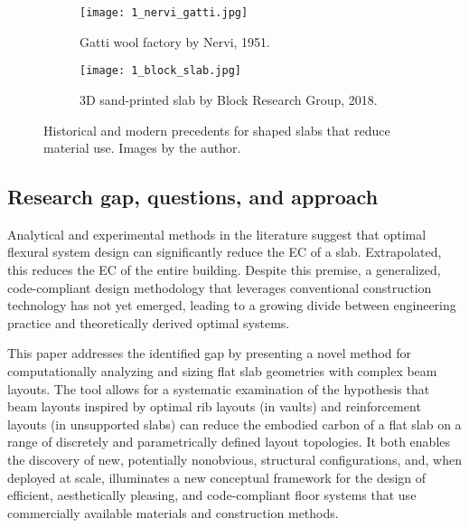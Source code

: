 \documentclass[10pt, letterpaper]{article} %
\begin{document}
    \begin{figure}[ht]
        \centering
        \begin{subfigure}[c]{0.4\textwidth}
            \centering
            \texttt{[image: 1\_nervi\_gatti.jpg]} 
            \caption{Gatti wool factory by Nervi, 1951. \cite{nerviAestheticsTechnologyBuilding1965}}
            \label{fig:subfigure1}
        \end{subfigure}
        \hfill
        \begin{subfigure}[c]{0.53\textwidth}
            \centering
            \texttt{[image: 1\_block\_slab.jpg]} 
            \caption{3D sand-printed slab by Block Research Group, 2018. \cite{rippmannDesignFabricationTesting2018}}
            \label{fig:subfigure2}
        \end{subfigure}
        \caption{Historical and modern precedents for shaped slabs that reduce material use. Images by the author.}
        \label{fig:nervi-block}
    \end{figure}

    \subsection{Research gap, questions, and approach}

    Analytical and experimental methods in the literature suggest that optimal flexural system design can significantly reduce the EC of a slab. Extrapolated, this reduces the EC of the entire building. Despite this premise, a generalized, code-compliant design methodology that leverages conventional construction technology has not yet emerged, leading to a growing divide between engineering practice and theoretically derived optimal systems.

    This paper addresses the identified gap by presenting a novel method for computationally analyzing and sizing flat slab geometries with complex beam layouts. The tool allows for a systematic examination of the hypothesis that beam layouts inspired by optimal rib layouts (in vaults) and reinforcement layouts (in unsupported slabs) can reduce the embodied carbon of a flat slab on a range of discretely and parametrically defined layout topologies. It both enables the discovery of new, potentially nonobvious, structural configurations, and, when deployed at scale, illuminates a new conceptual framework for the design of efficient, aesthetically pleasing, and code-compliant floor systems that use commercially available materials and construction methods. 
\end{document}
